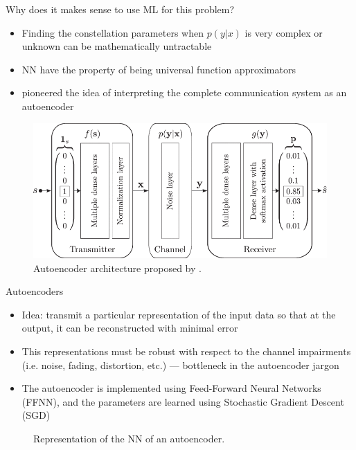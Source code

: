 \documentclass[english,aspectratio=1610,9pt,helvet,nicetitles]{ICEbeamerTUMCD}
\begin{document}
\begin{frame}{Why does it makes sense to use ML for this problem?}
\begin{itemize}
\item Finding the constellation parameters when $p(y|x)$ is very complex or unknown can be mathematically untractable
\item NN have the property of being universal function approximators \cite{HORNIK1989359}
\item \citet{O'Shea} pioneered the idea of interpreting the complete communication system as an autoencoder
\end{itemize}
\begin{figure}
\includegraphics[width=0.5\columnwidth]{ressources/oshea.png}
\caption{Autoencoder architecture proposed by \citep{O'Shea}.}
\end{figure}
\end{frame}

\begin{frame}{Autoencoders}
\begin{itemize}
\item Idea: transmit a particular representation of the input data so that at the output, it can be reconstructed with minimal error
\item This representations must be robust with respect to the channel impairments (i.e. noise, fading, distortion, etc.) --- bottleneck in the autoencoder jargon
\item The autoencoder is implemented using Feed-Forward Neural Networks (FFNN), and the parameters are learned using Stochastic Gradient Descent (SGD)
\end{itemize}
\vspace{-5mm}
\begin{figure}
\centering
\resizebox{!}{11em}{

}
\caption{Representation of the NN of an autoencoder.}
\label{fig:autoencoder}
\end{figure}

\end{frame}
\end{document}
